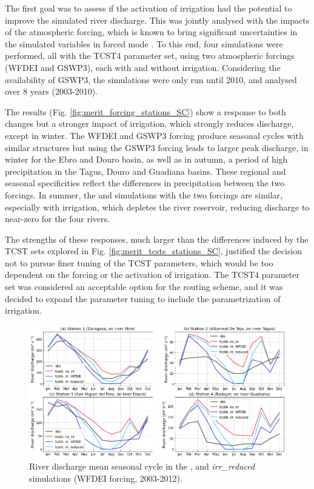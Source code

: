 The first goal was to assess if the activation of irrigation had the potential to improve the simulated river discharge. This was jointly analysed with the impacts of the atmospheric forcing, which is known to bring significant uncertainties in the simulated variables in forced mode \citep{gelati_hydrological_2018,boone_land_2025}.
To this end,  four simulations were performed, all with the TCST4 parameter set, using two atmospheric forcings (WFDEI and GSWP3), each with and without irrigation. Considering the availability of GSWP3, the simulations were only run until 2010, and analysed over 8 years (2003-2010).

The results (Fig. \ref{fig:merit_forcing_stations_SC}) show a response to both changes but a stronger impact of irrigation, which strongly reduces discharge, except in winter. The WFDEI and GSWP3 forcing produce seasonal cycles with similar structures but using the GSWP3 forcing leads to larger peak discharge, in winter for the Ebro and Douro basin, as well as in autumn, a period of high precipitation in the Tagus, Douro and Guadiana basins. These regional and seasonal specificities reflect the differences in precipitation between the two forcings. 
In summer, the \noirr and \irr simulations with the two forcings are similar, especially with irrigation, which depletes the river reservoir, reducing discharge to near-zero for the four rivers.

The strengths of these responses, much larger than the differences induced by the TCST sets explored in Fig. \ref{fig:merit_tcsts_stations_SC}, justified the decision not to pursue finer tuning of the TCST parameters, which would be too dependent on the forcing or the activation of irrigation. The TCST4 parameter set was considered an acceptable option for the routing scheme, and it was decided to expand the parameter tuning to include the parametrization of irrigation. 

\begin{figure}[htbp]
    \centering
    \includegraphics[width=\textwidth]{images/chap3/river_discharge/merit_irr_4stations_SC.png}
    \caption{River discharge mean seasonal cycle  in the \noirr, \irr and \textit{irr\_reduced} simulations (WFDEI forcing, 2003-2012).}
    \label{fig:merit_irr_stations_SC}
\end{figure}

